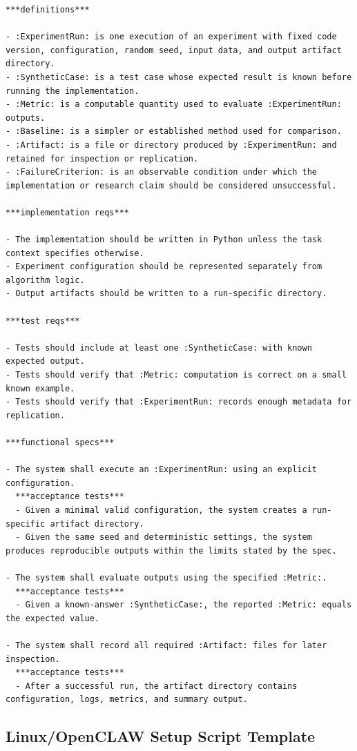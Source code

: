 \documentclass[11pt]{article}
\begin{document}
\begin{lstlisting}
***definitions***

- :ExperimentRun: is one execution of an experiment with fixed code version, configuration, random seed, input data, and output artifact directory.
- :SyntheticCase: is a test case whose expected result is known before running the implementation.
- :Metric: is a computable quantity used to evaluate :ExperimentRun: outputs.
- :Baseline: is a simpler or established method used for comparison.
- :Artifact: is a file or directory produced by :ExperimentRun: and retained for inspection or replication.
- :FailureCriterion: is an observable condition under which the implementation or research claim should be considered unsuccessful.

***implementation reqs***

- The implementation should be written in Python unless the task context specifies otherwise.
- Experiment configuration should be represented separately from algorithm logic.
- Output artifacts should be written to a run-specific directory.

***test reqs***

- Tests should include at least one :SyntheticCase: with known expected output.
- Tests should verify that :Metric: computation is correct on a small known example.
- Tests should verify that :ExperimentRun: records enough metadata for replication.

***functional specs***

- The system shall execute an :ExperimentRun: using an explicit configuration.
  ***acceptance tests***
  - Given a minimal valid configuration, the system creates a run-specific artifact directory.
  - Given the same seed and deterministic settings, the system produces reproducible outputs within the limits stated by the spec.

- The system shall evaluate outputs using the specified :Metric:.
  ***acceptance tests***
  - Given a known-answer :SyntheticCase:, the reported :Metric: equals the expected value.

- The system shall record all required :Artifact: files for later inspection.
  ***acceptance tests***
  - After a successful run, the artifact directory contains configuration, logs, metrics, and summary output.
\end{lstlisting}

\subsection{Linux/OpenCLAW Setup Script Template}
\end{document}

